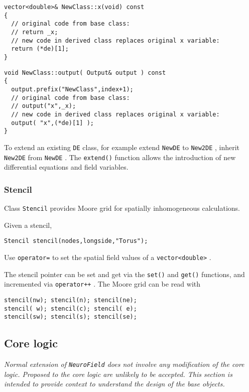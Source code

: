 \documentclass[12pt,a4paper]{article}
\newcommand{\type}[1]{{\small\small\tt #1} }
\newcommand{\NF}[0]{\type{NeuroField}}
\begin{document}
\begin{lstlisting}
vector<double>& NewClass::x(void) const
{
  // original code from base class:
  // return _x;
  // new code in derived class replaces original x variable:
  return (*de)[1];
}
\end{lstlisting}

\begin{lstlisting}
void NewClass::output( Output& output ) const
{
  output.prefix("NewClass",index+1);
  // original code from base class:
  // output("x",_x);
  // new code in derived class replaces original x variable:
  output( "x",(*de)[1] );
}
\end{lstlisting}

To extend an existing \type{DE} class, for example extend \type{NewDE} to \type{New2DE}, inherit \type{New2DE} from \type{NewDE}. The \type{extend()} function allows the introduction of new differential equations and field variables.

\subsubsection{Stencil}
\label{sec:stencil}

Class \type{Stencil} provides Moore grid for spatially inhomogeneous calculations.

Given a stencil,
\begin{lstlisting}
Stencil stencil(nodes,longside,"Torus");
\end{lstlisting}

Use \type{operator=} to set the spatial field values of a \type{vector<double>}.

The stencil pointer can be set and get via the \type{set()} and \type{get()} functions, and incremented via \type{operator++}. The Moore grid can be read with
\begin{lstlisting}
stencil(nw); stencil(n); stencil(ne);
stencil( w); stencil(c); stencil( e);
stencil(sw); stencil(s); stencil(se);
\end{lstlisting}

\subsection{Core logic}

{\em Normal extension of \NF does not involve any modification of the core logic. Proposed to the core logic are unlikely to be accepted. This section is intended to provide context to understand the design of the base objects.}
\end{document}
